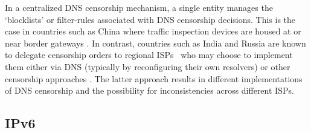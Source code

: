 In a centralized DNS censorship mechanism, a single entity manages the
`blocklists' or filter-rules associated with DNS censorship decisions. This is
the case in countries such as China where traffic inspection devices are housed
at or near border gateways \cite{xu2011internet}. In contrast, countries such
as India and Russia are known to delegate censorship orders to regional
ISPs~\cite{Gosain2017a}
who may choose to implement them either via DNS (typically by reconfiguring
their own resolvers) or other censorship approaches
\cite{ramesh2020decentralized, Yadav2018a, singh2020india}. The latter approach results in
different implementations of DNS censorship and the possibility for
inconsistencies across different ISPs.

% 
\subsection{IPv6} \label{sec:background:ipv6}

